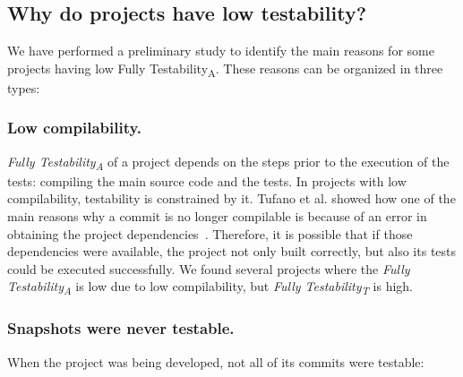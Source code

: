 
\subsection{Why do projects have low testability?}
\label{sec:low-testability}

We have performed a preliminary study to identify the main reasons for some projects having low Fully Testability\textsubscript{A}. 
These reasons can be organized in three types:

\subsubsection{Low compilability.} 

\textit{Fully Testability\textsubscript{A}} of a project depends on the steps prior to the execution of the tests: compiling the main source code and the tests.
In projects with low compilability, testability is constrained by it.
Tufano et al. showed how one of the main reasons why a commit is no longer compilable is because of an error in obtaining the project dependencies~\cite{tufano2017there}. 
Therefore, it is possible that if those dependencies were available, the project not only built correctly, but also its tests could be executed successfully. 
We found several projects where the \textit{Fully Testability\textsubscript{A}} is low due to low compilability, but \textit{Fully Testability\textsubscript{T}} is high.

\subsubsection{Snapshots were never testable.} When the project was being developed, not all of its commits were testable:

